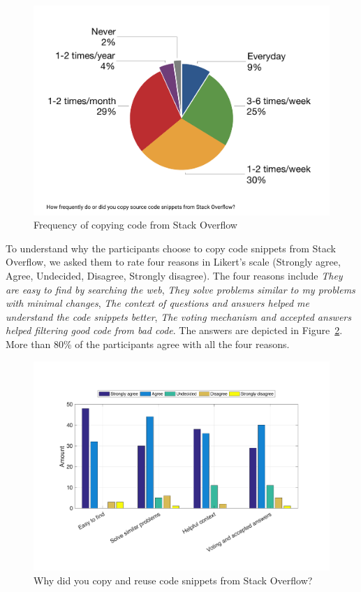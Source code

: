\documentclass{svjour3}                     %
\begin{document}
\begin{figure} \centering
	\includegraphics[width=.5\linewidth]{survey_visitor_frequency_so_copy} 
	\caption{Frequency of copying code from Stack Overflow}
	\label{fig:survey_visitor_frequency_so_copy-crop} 
\end{figure}

To understand why the participants choose to copy code snippets from Stack
Overflow, we asked them to rate four reasons in Likert's scale (Strongly agree,
Agree, Undecided, Disagree, Strongly disagree). The four reasons include
\textit{They are easy to find by searching the web}, \textit{They solve problems
	similar to my problems with minimal changes}, \textit{The context of questions
	and answers helped me understand the code snippets better}, \textit{The voting
	mechanism and accepted answers helped filtering good code from bad code}. The
answers are depicted in Figure~\ref{fig:survey_visitor_why_copy_so}. More than 80\% of the
participants agree with all the four reasons. 

\begin{figure} \centering
	\includegraphics[width=0.6\linewidth]{survey_visitor_why_copy_so} 
	\caption{Why did you copy and reuse code snippets from Stack Overflow?}
	\label{fig:survey_visitor_why_copy_so} 
\end{figure}

\vspace{0.5cm} \noindent{} \vspace{0.5cm}
\end{document}
